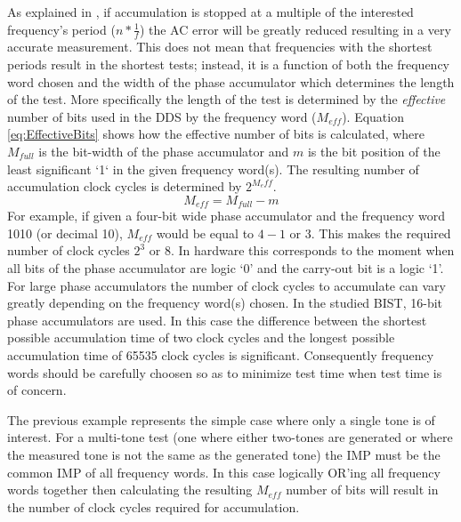 \documentclass[12pt]{report}
\begin{document}
As explained in \cite{testtime}, if accumulation is stopped at a multiple of the interested frequency's period ($n*\frac{1}{f}$) the AC error will be greatly reduced resulting in a very accurate measurement.  This does not mean that frequencies with the shortest periods result in the shortest tests; instead, it is a function of both the frequency word chosen and the width of the phase accumulator which determines the length of the test.  More specifically the length of the test is determined by the \textit{effective} number of bits used in the DDS by the frequency word ($M_{eff}$).  Equation \ref{eq:EffectiveBits} shows how the effective number of bits is calculated, where $M_{full}$ is the bit-width of the phase accumulator and $m$ is the bit position of the least significant `1` in the given frequency word(s)\cite{jie}.  The resulting number of accumulation clock cycles is determined by $2^{M_eff}$.
\begin{equation}
	M_{eff} = M_{full} - m
	\label{eq:EffectiveBits}
\end{equation}
For example, if given a four-bit wide phase accumulator and the frequency word 1010 (or decimal 10), $M_{eff}$ would be equal to $4 - 1$ or 3.  This makes the required number of clock cycles $2^3$ or $8$.  In hardware this corresponds to the moment when all bits of the phase accumulator are logic `0' and the carry-out bit is a logic `1'\cite{jie}.  For large phase accumulators the number of clock cycles to accumulate can vary greatly depending on the frequency word(s) chosen.  In the studied BIST, 16-bit phase accumulators are used.  In this case the difference between the shortest possible accumulation time of two clock cycles and the longest possible accumulation time of 65535 clock cycles is significant.  Consequently frequency words should be carefully choosen so as to minimize test time when test time is of concern\cite{jie}.  

The previous example represents the simple case where only a single tone is of interest.  For a multi-tone test (one where either two-tones are generated or where the measured tone is not the same as the generated tone) the IMP must be the common IMP of all frequency words\cite{jie}.  In this case logically OR'ing all frequency words together then calculating the resulting $M_{eff}$ number of bits will result in the number of clock cycles required for accumulation\cite{jie}\cite{testtime}.
\end{document}
